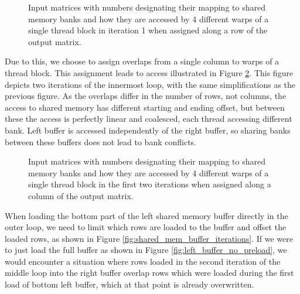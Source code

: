 \begin{figure}[ht]
	\centering
	\def\svgwidth{0.4\textwidth}
	\fontsize{8}{10}\selectfont
	
	\caption{Input matrices with numbers designating their mapping to shared memory banks and how they are accessed by 4 different warps of a single thread block in iteration 1 when assigned along a row of the output matrix.}
	\label{fig:warp_per_shift_shared_mem_overlaps_in_x}
\end{figure}

Due to this, we choose to assign overlaps from a single column to warps of a thread block. This assignment leads to access illustrated in Figure \ref{fig:warp_per_shift_shared_mem_shifts}. This figure depicts two iterations of the innermost loop, with the same simplifications as the previous figure.  As the overlaps differ in the number of rows, not columns, the access to shared memory has different starting and ending offset, but between these the access is perfectly linear and coalesced, each thread accessing different bank. Left buffer is accessed independently of the right buffer, so sharing banks between these buffers does not lead to bank conflicts.


\begin{figure}[ht]
	\centering
	\def\svgwidth{0.7\textwidth}
	\fontsize{8}{10}\selectfont
	
	\caption{Input matrices with numbers designating their mapping to shared memory banks and how they are accessed by 4 different warps of a single thread block in the first two iterations when assigned along a column of the output matrix.}
	\label{fig:warp_per_shift_shared_mem_shifts}
\end{figure}

When loading the bottom part of the left shared memory buffer directly in the outer loop, we need to limit which rows are loaded to the buffer and offset the loaded rows, as shown in Figure \ref{fig:shared_mem_buffer_iterations}. If we were to just load the full buffer as shown in Figure \ref{fig:left_buffer_no_preload}, we would encounter a situation where rows loaded in the second iteration of the middle loop into the right buffer overlap rows which were loaded during the first load of bottom left buffer, which at that point is already overwritten.  


